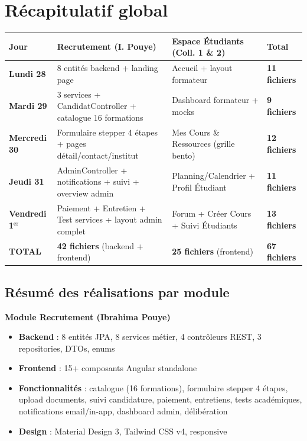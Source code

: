 \documentclass[a4paper,12pt,french]{article}
\begin{document}
\newpage

\section{Récapitulatif global}

\begin{center}
\begin{tabular}{|p{3cm}|p{4.5cm}|p{4.5cm}|p{2.5cm}|}
\hline
\textbf{Jour} & \textbf{Recrutement (I. Pouye)} & \textbf{Espace Étudiants (Coll. 1 \& 2)} & \textbf{Total} \\
\hline
\addlinespace
\textbf{Lundi 28} &
8 entités backend + landing page &
Accueil + layout formateur &
\textbf{11 fichiers} \\
\hline
\addlinespace
\textbf{Mardi 29} &
3 services + CandidatController + catalogue 16 formations &
Dashboard formateur + mocks &
\textbf{9 fichiers} \\
\hline
\addlinespace
\textbf{Mercredi 30} &
Formulaire stepper 4 étapes + pages détail/contact/institut &
Mes Cours \& Ressources (grille bento) &
\textbf{12 fichiers} \\
\hline
\addlinespace
\textbf{Jeudi 31} &
AdminController + notifications + suivi + overview admin &
Planning/Calendrier + Profil Étudiant &
\textbf{11 fichiers} \\
\hline
\addlinespace
\textbf{Vendredi 1$^\text{er}$} &
Paiement + Entretien + Test services + layout admin complet &
Forum + Créer Cours + Suivi Étudiants &
\textbf{13 fichiers} \\
\hline
\addlinespace
\hline
\textbf{TOTAL} &
\textbf{42 fichiers} (backend + frontend) &
\textbf{25 fichiers} (frontend) &
\textbf{67 fichiers} \\
\hline
\end{tabular}
\end{center}

\subsection{Résumé des réalisations par module}

\begin{modulebox}
\textbf{Module Recrutement (Ibrahima Pouye)}

\begin{itemize}
    \item \textbf{Backend} : 8 entités JPA, 8 services métier, 4 contrôleurs REST, 3 repositories, DTOs, enums
    \item \textbf{Frontend} : 15+ composants Angular standalone
    \item \textbf{Fonctionnalités} : catalogue (16 formations), formulaire stepper 4 étapes, upload documents, suivi candidature, paiement, entretiens, tests académiques, notifications email/in-app, dashboard admin, délibération
    \item \textbf{Design} : Material Design 3, Tailwind CSS v4, responsive
\end{itemize}
\end{modulebox}
\end{document}
